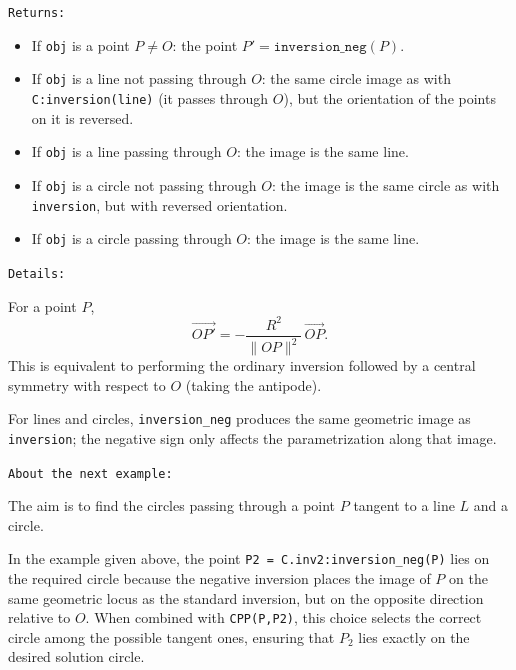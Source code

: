 \texttt{Returns: }
\begin{itemize}
  \item If \verb|obj| is a point \(P\neq O\): the point \(P'=\texttt{inversion\_neg}(P)\).
  \item If \verb|obj| is a line not passing through \(O\): the same circle image
  as with \verb|C:inversion(line)| (it passes through \(O\)), but the orientation of the
  points on it is reversed.
  \item If \verb|obj| is a line passing through \(O\): the image is the same
  line.
  \item If \verb|obj| is a circle not passing through \(O\): the image is the same
  circle as with \verb|inversion|, but with reversed orientation.
  \item If \verb|obj| is a circle passing through \(O\): the image is the same line.
\end{itemize}

\texttt{Details: }

For a point \(P\),
\[
\vec{OP'} = -\frac{R^2}{\|OP\|^2}\,\vec{OP}.
\]
This is equivalent to performing the ordinary inversion followed by a
central symmetry with respect to \(O\) (taking the antipode).

For lines and circles, \verb|inversion_neg| produces the same geometric image as
\verb|inversion|; the negative sign only affects the parametrization along that
image.

\texttt{About the next example: }

The aim is to find the circles passing through a point $P$ tangent to a line $L$ and a circle.


In the example given above, the point
\verb|P2 = C.inv2:inversion_neg(P)| lies on the required circle because
the negative inversion places the image of \(P\) on the same geometric locus as
the standard inversion, but on the opposite direction relative to \(O\).
When combined with \verb|CPP(P,P2)|, this choice selects the correct circle among
the possible tangent ones, ensuring that \(P_2\) lies exactly on the desired
solution circle.



